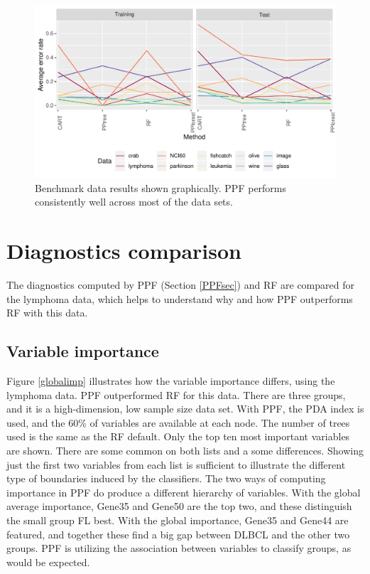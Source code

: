 \documentclass[12pt]{article}\usepackage[]{graphicx}\usepackage[]{color}
\makeatletter
\def\maxwidth{ %
  \ifdim\Gin@nat@width>\linewidth
    \linewidth
  \else
    \Gin@nat@width
  \fi
}
\newenvironment{knitrout}{}{} %
\makeatother
\begin{document}
\begin{figure}[!hbpt]
\begin{knitrout}
\color{fgcolor}
\includegraphics[width=\maxwidth]{figure/parbench-1} 

\end{knitrout}
\caption{Benchmark data results shown graphically. PPF performs consistently well across most of the data sets. \label{parallel}}
\end{figure}



\section{Diagnostics comparison}\label{options}

The diagnostics computed by PPF (Section \ref{PPFsec}) and RF are compared for the lymphoma data, which helps to understand why and how PPF outperforms RF with this data.

\subsection{Variable importance}

Figure \ref{globalimp} illustrates how the variable importance differs, using the lymphoma data. PPF outperformed RF for this data. There are three groups, and it is a high-dimension, low sample size data set. With PPF, the PDA index is used, and the 60\% of variables are available at each node. The number of trees used is the same as the RF default. Only the top ten most important variables are shown. There are some common on both lists and a some differences. Showing just the first two variables from each list is sufficient to illustrate the different type of boundaries induced by the classifiers. The two ways of computing importance in PPF do produce a different hierarchy of variables. With the global average importance, Gene35 and Gene50 are the top two, and these distinguish the small group FL best. With the global importance, Gene35 and Gene44 are featured, and together these find a big gap between DLBCL and the other two groups. PPF is utilizing the association between variables to classify groups, as would be expected.
\end{document}
